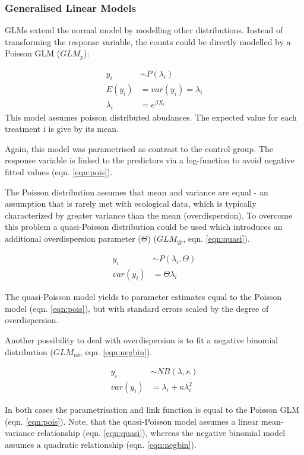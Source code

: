 \documentclass[twocolumn, natbib]{svjour3}
\begin{document}
\subsubsection{Generalised Linear Models}
GLMs extend the normal model by modelling other distributions.
Instead of transforming the response variable, the counts could be directly modelled by a Poisson GLM ($GLM_p$):

\begin{align}
  y_i &\sim P(\lambda_i) \nonumber \\
  E(y_i) &= var(y_i) = \lambda_i \label{eqn:pois} \\
  \lambda_i &= e^{\beta X_i}  \nonumber
\end{align}
This model assumes poisson distributed abudances.
The expected value for each treatment i is give by its mean. 

Again, this model was parametrised as contrast to the control group. 
The response variable is linked to the predictors via a log-function to avoid negative fitted values (eqn. \ref{eqn:pois}). 

The Poisson distribution assumes that mean and variance are equal - an assumption that is rarely met with ecological data, which is typically characterized by greater variance than the mean (overdispersion).
To overcome this problem a quasi-Poisson distribution could be used which introduces an additional overdispersion parameter ($\Theta$) ($GLM_{qp}$, eqn. \ref{eqn:quasi}).

\begin{align}
  y_i &\sim P(\lambda_i, \Theta) \label{eqn:quasi} \\
  var(y_i) &= \Theta \lambda_i  \nonumber
\end{align}

The quasi-Poisson model yields to parameter estimates equal to the Poisson model (eqn. \ref{eqn:pois}), but with standard errors scaled by the degree of overdispersion.

Another possibility to deal with overdispersion is to fit a negative binomial distribution ($GLM_{nb}$, eqn. \ref{eqn:negbin}).

\begin{align}
  y_i &\sim NB(\lambda, \kappa) \label{eqn:negbin}  \\
  var(y_i) &= \lambda_i + \kappa \lambda_i^2 \nonumber
\end{align}

In both cases the parametrisation and link function is equal to the Poisson GLM (eqn. \ref{eqn:pois}).
Note, that the quasi-Poisson model assumes a linear mean-variance relationship (eqn. \ref{eqn:quasi}), whereas the negative binomial model assumes a quadratic relationship (eqn. \ref{eqn:negbin}).
\end{document}
